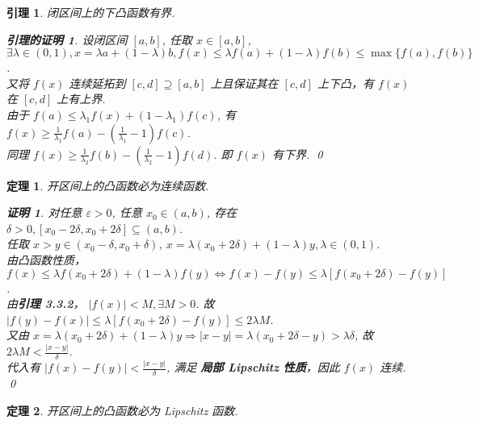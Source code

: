 \documentclass{ctexart}
\newcommand{\。}{．} %
\newenvironment{huangse}{
    \begin{tcolorbox}[enhanced, colback=qhuang, boxrule=0pt, frame hidden,
        borderline west={0.7mm}{0.1mm}{shuang}]
    }
    {\end{tcolorbox}}
\theoremstyle{t} %
\newtheorem{dlhj}{\color{shuang} 定理}[subsection]
\newtheorem*{zmhj}{\color{slan} 证明}
\newtheorem{ylhj}{\color{shuang} 引理}[subsection]
\newtheorem*{ylzmhj}{\color{slan} 引理的证明}
\newenvironment{dl}{\begin{huangse}\begin{dlhj}}{\end{dlhj}\end{huangse}}
\newenvironment{yl}{\begin{huangse}\begin{ylhj}}{\end{ylhj}\end{huangse}}
\begin{document}
\begin{yl}
    闭区间上的下凸函数有界.
    \begin{ylzmhj}
        设闭区间 $[a, b]$, 任取 $x \in [a, b]$, $\exists \lambda \in (0, 1), x = \lambda a + (1 - \lambda) b, f(x) \leqslant \lambda f(a) + (1 - \lambda )f(b) \leqslant \max\{f(a), f(b)\}$. \\
        又将 $f(x)$ 连续延拓到 $[c, d] \supseteq [a, b]$ 上且保证其在 $[c, d]$ 上下凸，有 $f(x)$ 在 $[c, d]$ 上有上界. \\
        由于 $f(a) \leqslant \lambda_1f(x) + (1 - \lambda_1)f(c)$, 有 $f(x) \geqslant \frac{1}{\lambda_1}f(a) - \left(\frac{1}{\lambda_1} - 1\right)f(c)$. \\
        同理 $f(x) \geqslant \frac{1}{\lambda_2}f(b) - \left(\frac{1}{\lambda_2} - 1\right)f(d)$. 即 $f(x)$ 有下界.
        \qed
    \end{ylzmhj}
\end{yl}


\begin{dl}
    开区间上的凸函数必为连续函数. 
    \begin{zmhj}
        对任意 $\varepsilon > 0$, 任意 $x_0 \in (a, b)$, 存在 $\delta > 0, [x_0 - 2\delta, x_0 + 2\delta] \subseteq (a, b)$. \\
        任取 $x > y \in (x_0 - \delta, x_0 + \delta)$, $x = \lambda (x_0 + 2\delta) + (1 - \lambda)y, \lambda \in (0, 1)$. \\
        由凸函数性质， $f(x) \leqslant \lambda f(x_0 + 2\delta) + (1 - \lambda)f(y) \Leftrightarrow f(x) - f(y)\leqslant \lambda[f(x_0 + 2\delta) - f(y)]$. \\
        由\textcolor{shuang}{\textbf{引理 3.3.2}}， $\left\lvert f(x)\right\rvert < M, \exists M > 0$. 故 $\left\lvert f(y) - f(x)\right\rvert \leqslant \lambda[f(x_0 + 2\delta) - f(y)] \leqslant 2\lambda M$. \\
        又由 $x = \lambda (x_0 + 2\delta) + (1 - \lambda)y \Rightarrow \left\lvert x - y\right\rvert = \lambda(x_0 + 2\delta - y) > \lambda\delta$, 故 $2\lambda M < \frac{\left\lvert x - y\right\rvert}{\delta}$. \\
        代入有 $\left\lvert f(x) - f(y)\right\rvert < \frac{\left\lvert x - y\right\rvert }{\delta}$, 满足 \textbf{局部 Lipschitz 性质}，因此 $f(x)$ 连续.
        \qed
    \end{zmhj}
\end{dl}

\begin{dl}
    开区间上的凸函数必为 Lipschitz 函数.
\end{dl}
\end{document}
